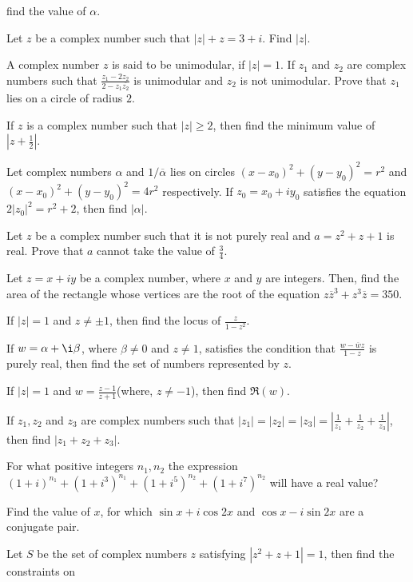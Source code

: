   find the value of $\alpha$.
\item Let $z$ be a complex number such that $|z| + z = 3 + i$. Find $|z|$.
\item A complex number $z$ is said to be unimodular, if $|z| = 1$. If $z_1$ and $z_2$ are complex numbers
  such that $\frac{z_1 - 2z_2}{2 - z_1\overline{z_2}}$ is unimodular and $z_2$ is not unimodular. Prove that
  $z_1$ lies on a circle of radius $2$.
\item If $z$ is a complex number such that $|z|\geq 2$, then find the minimum value of $\left|z +
  \frac{1}{2}\right|$.
\item Let complex numbers $\alpha$ and $1/\overline{\alpha}$ lies on circles $(x - x_0)^2 + (y - y_0)^2 =
  r^2$ and $(x - x_0)^2 + (y - y_0)^2 = 4r^2$ respectively. If $z_0 = x_0 + iy_0$ satisfies the equation
  $2|z_0|^2 = r^2 + 2$, then find $|\alpha|$.
\item Let $z$ be a complex number such that it is not purely real and $a = z^2 + z + 1$ is real. Prove that
  $a$ cannot take the value of $\frac{3}{4}$.
\item Let $z = x + iy$ be a complex number, where $x$ and $y$ are integers. Then, find the area of the
  rectangle whose vertices are the root of the equation $z\overline{z}^3 + z^3\overline{z} = 350$.
\item If $|z| = 1$ and $z\neq \pm 1$, then find the locus of $\frac{z}{1 - z^2}$.
\item If $w = \alpha + \i\beta$, where $\beta\neq 0$ and $z\neq 1$, satisfies the condition that $\frac{w -
  \overline{w}z}{1 - z}$ is purely real, then find the set of numbers represented by $z$.
\item If $|z| = 1$ and $w = \frac{z - 1}{z + 1}$(where, $z\neq -1$), then find $\Re(w)$.
\item If $z_1, z_2$ and $z_3$ are complex numbers such that $|z_1| = |z_2| = |z_3| = \left|\frac{1}{z_1} +
  \frac{1}{z_2} + \frac{1}{z_3}\right|$, then find $|z_1 + z_2 + z_3|$.
\item For what positive integers $n_1, n_2$ the expression $(1 + i)^{n_1} + (1 + i^3)^{n_1} + (1 +
  i^5)^{n_2} + (1 + i^7)^{n_2}$ will have a real value?
\item Find the value of $x$, for which $\sin x + i\cos2x$ and $\cos x -i\sin 2x$ are a conjugate pair.
\item Let $S$ be the set of complex numbers $z$ satisfying $|z^2 + z + 1| = 1$, then find the constraints on
